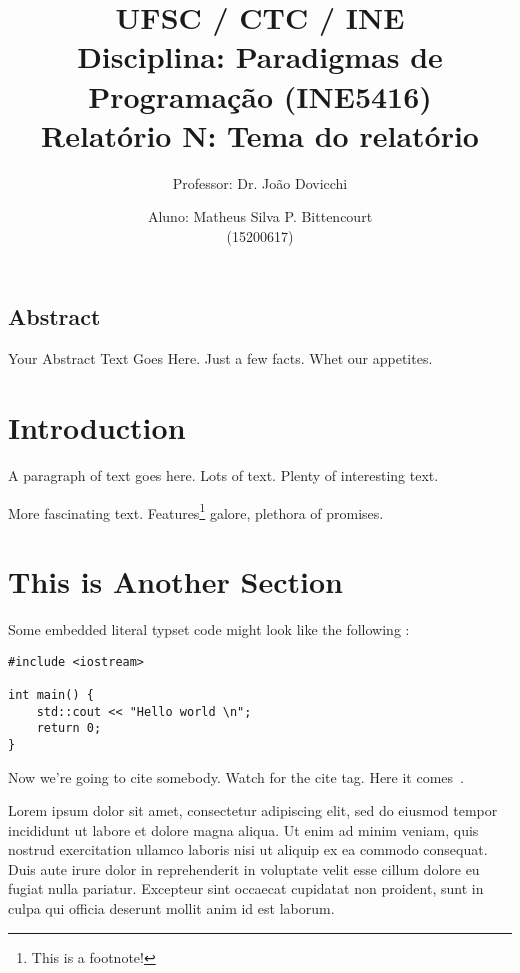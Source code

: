 \documentclass[a4paper,twocolumn,10pt]{article}
\begin{document}
\title{
	\large \rm UFSC / CTC / INE\\
	\large \rm Disciplina: Paradigmas de Programação (INE5416)\\
	\Large \bf Relatório N: Tema do relatório
}

\author{
	Professor: Dr. João Dovicchi\\
	\and
	Aluno: Matheus Silva P. Bittencourt\\(15200617)
}

\maketitle

\thispagestyle{empty} %

\subsection*{Abstract}
Your Abstract Text Goes Here.  Just a few facts.  Whet our appetites.

\section{Introduction}

A paragraph of text goes here.  Lots of text.  Plenty of interesting text.

\hbox{}

More fascinating text. Features\footnote{This is a footnote!} galore, plethora
of promises.

\hbox{}

\section{This is Another Section}

Some embedded literal typset code might
look like the following :

\begin{verbatim}
#include <iostream>

int main() {
    std::cout << "Hello world \n";
    return 0;
}

\end{verbatim}

Now we're going to cite somebody.  Watch for the cite tag.
Here it comes~\cite{Einstein}.

Lorem ipsum dolor sit amet, consectetur adipiscing elit, sed do eiusmod tempor
incididunt ut labore et dolore magna aliqua. Ut enim ad minim veniam, quis
nostrud exercitation ullamco laboris nisi ut aliquip ex ea commodo consequat.
Duis aute irure dolor in reprehenderit in voluptate velit esse cillum dolore eu
fugiat nulla pariatur. Excepteur sint occaecat cupidatat non proident, sunt in
culpa qui officia deserunt mollit anim id est laborum.
\end{document}
